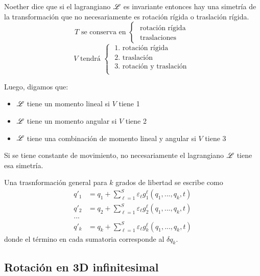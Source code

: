 \documentclass[10pt,oneside]{CBFT_book}
\begin{document}
Noether dice que si el lagrangiano $\mathscr{L}$ es invariante entonces hay una simetría de la transformación que no 
necesariamente es rotación rígida o traslación rígida.
\[
	T \text{ se conserva en } \begin{cases}
	                           \text{ rotación rígida } \\
	                           \text{ traslaciones }
	                          \end{cases}
\]
\[
	V \text{ tendrá } \begin{cases}
			   \text{ 1. rotación rígida } \\
			    \text{ 2. traslación } \\
			     \text{ 3. rotación y traslación } \\
	                  \end{cases}
\]

Luego, digamos que:
\begin{itemize}
 \item $\mathscr{L}$ tiene un momento lineal si $V$ tiene 1
 \item $\mathscr{L}$ tiene un momento angular si $V$ tiene 2 
 \item $\mathscr{L}$ tiene una combinación de momento lineal y angular si $V$ tiene 3
\end{itemize}

Si se tiene constante de movimiento, no necesariamente el lagrangiano $\mathscr{L}$ tiene esa simetría.

Una trasnformación general para $k$ grados de libertad se escribe como 
\begin{eqnarray*}
	q'_1 &= q_1 + \sum_{\ell=1}^S \varepsilon_\ell g_1^\ell(q_1,...,q_k,t) \\
	q'_2 &= q_2 + \sum_{\ell=1}^S \varepsilon_\ell g_2^\ell(q_1,...,q_k,t) \\
	... \\
	q'_k &= q_k + \sum_{\ell=1}^S \varepsilon_\ell g_k^\ell(q_1,...,q_k,t)
\end{eqnarray*}
donde el término en cada sumatoria corresponde al $\delta q_k$.


\subsection{Rotación en 3D infinitesimal}
\end{document}
